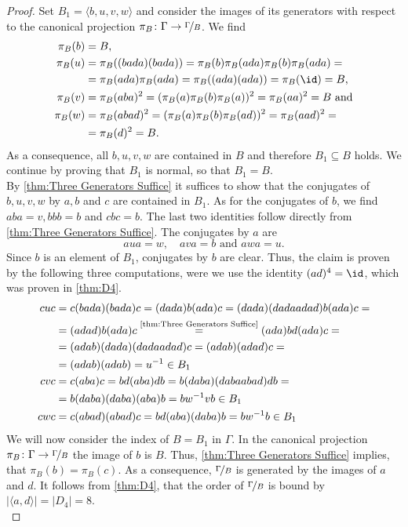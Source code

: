 \begin{proof}
Set $B_1=\langle b,u,v,w\rangle$ and consider the images of its generators with respect to the canonical projection $\pi_B\colon\Gamma\to\nicefrac{\Gamma}{B}$. We find
\begin{align*}
\pi_B(b)&=B,\\
\pi_B(u)	&=\pi_B((bada)(bada))=\pi_B(b)\pi_B(ada)\pi_B(b)\pi_B(ada)=\\
		&=\pi_B(ada)\pi_B(ada)=\pi_B((ada)(ada))=\pi_B(\id)=B,\\
\pi_B(v)	&=\pi_B(aba)^2=(\pi_B(a)\pi_B(b)\pi_B(a))^2=\pi_B(aa)^2=B \text{ and}\\
\pi_B(w)	&=\pi_B(abad)^2=(\pi_B(a)\pi_B(b)\pi_B(ad))^2=\pi_B(aad)^2=\\
		&=\pi_B(d)^2=B.
\end{align*}
As a consequence, all $b,u,v,w$ are contained in $B$ and therefore $B_1\subseteq B$ holds. We continue by proving that $B_1$ is normal, so that $B_1=B$.\\
By \cref{thm:Three Generators Suffice} it suffices to show that the conjugates of $b,u,v,w$ by $a,b$ and $c$ are contained in $B_1$. As for the conjugates of $b$, we find $aba=v, bbb=b$ and $cbc=b$. The last two identities follow directly from \cref{thm:Three Generators Suffice}. The conjugates by $a$ are
\begin{equation*}
aua=w, \quad ava=b \text{ and } awa=u.
\end{equation*}
Since $b$ is an element of $B_1$, conjugates by $b$ are clear. Thus, the claim is proven by the following three computations, were we use the identity $(ad)^4=\id$, which was proven in \cref{thm:D4}.
\begin{align*}
cuc	&=c(bada)(bada)c=(dada)b(ada)c=(dada)(dadaadad)b(ada)c=\\
	&=(adad)b(ada)c\overset{\text{\cref{thm:Three Generators Suffice}}}{=}(ada)bd(ada)c=\\
	&=(adab)(dada)(dadaadad)c=(adab)(adad)c=\\
	&=(adab)(adab)=u^{-1}\in B_1\\
cvc	&=c(aba)c=bd(aba)db=b(daba)(dabaabad)db=\\
	&=b(daba)(daba)(aba)b=bw^{-1}vb\in B_1\\
cwc	&=c(abad)(abad)c=bd(aba)(daba)b=bw^{-1}b\in B_1
\end{align*}
We will now consider the index of $B=B_1$ in $\Gamma$. In the canonical projection $\pi_B\colon\Gamma\to\nicefrac{\Gamma}{B}$ the image of $b$ is $B$. Thus, \cref{thm:Three Generators Suffice} implies, that $\pi_B(b)=\pi_B(c)$. As a consequence, $\nicefrac{\Gamma}{B}$ is generated by the images of $a$ and $d$. It follows from \cref{thm:D4}, that the order of $\nicefrac{\Gamma}{B}$ is bound by $\lvert\langle a,d\rangle\rvert=\lvert D_4\rvert=8$.\\

\end{proof}
